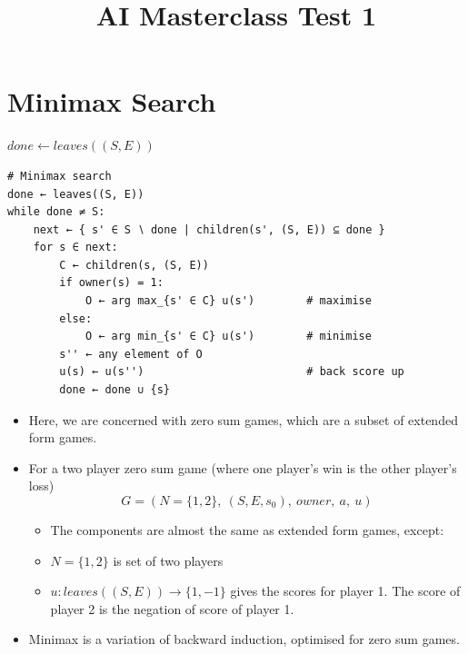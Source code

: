 \documentclass[12pt, a4paper]{article}
\title{AI Masterclass Test 1}
\author{}
\date{}
\begin{document}
\section{Minimax Search}
\begin{algorithm}[H]
\caption{Minimax search}

$done \leftarrow leaves((S, E))$\;
\end{algorithm}
\begin{Verbatim}
# Minimax search
done ← leaves((S, E))
while done ≠ S:
    next ← { s' ∈ S ∖ done | children(s', (S, E)) ⊆ done }
    for s ∈ next:
        C ← children(s, (S, E))
        if owner(s) = 1:
            O ← arg max_{s' ∈ C} u(s')        # maximise
        else:
            O ← arg min_{s' ∈ C} u(s')        # minimise
        s'' ← any element of O
        u(s) ← u(s'')                         # back score up
        done ← done ∪ {s}
\end{Verbatim}

\begin{itemize}
    \item Here, we are concerned with zero sum games, which are a subset of extended form games.
    \item For a two player zero sum game (where one player's win is the other player's loss)
    \[G = (N = \{1, 2\},\: (S, E, s_0),\: owner,\: a,\: u)\]
    \begin{itemize}
        \item The components are almost the same as extended form games, except:
        \item $N = \{1,2\}$ is set of two players
        \item $u: leaves((S, E))\rightarrow \{1,-1\}$ gives the scores for player 1.
        The score of player 2 is the negation of score of player 1. 
    \end{itemize}
    \item Minimax is a variation of backward induction, optimised for zero sum games.
\end{itemize}
\end{document}
